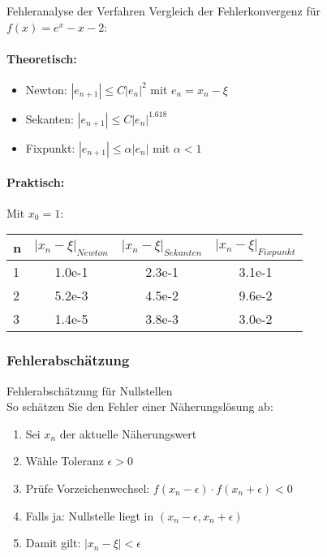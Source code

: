 \begin{example2}{Fehleranalyse der Verfahren}
Vergleich der Fehlerkonvergenz für $f(x) = e^x - x - 2$:

\paragraph{Theoretisch:}
\begin{itemize}
    \item Newton: $|e_{n+1}| \leq C|e_n|^2$ mit $e_n = x_n - \xi$
    \item Sekanten: $|e_{n+1}| \leq C|e_n|^{1.618}$
    \item Fixpunkt: $|e_{n+1}| \leq \alpha|e_n|$ mit $\alpha < 1$
\end{itemize}

\paragraph{Praktisch:} Mit $x_0 = 1$:
\begin{center}
\begin{tabular}{l|c|c|c}
n & $|x_n-\xi|_{Newton}$ & $|x_n-\xi|_{Sekanten}$ & $|x_n-\xi|_{Fixpunkt}$ \\\hline
1 & 1.0e-1 & 2.3e-1 & 3.1e-1 \\
2 & 5.2e-3 & 4.5e-2 & 9.6e-2 \\
3 & 1.4e-5 & 3.8e-3 & 3.0e-2
\end{tabular}
\end{center}
\end{example2}


\subsubsection{Fehlerabschätzung}



\begin{KR}{Fehlerabschätzung für Nullstellen}\\
So schätzen Sie den Fehler einer Näherungslösung ab:
\begin{enumerate}
    \item Sei $x_n$ der aktuelle Näherungswert
    \item Wähle Toleranz $\epsilon > 0$
    \item Prüfe Vorzeichenwechsel: $f(x_n-\epsilon) \cdot f(x_n+\epsilon) < 0$
    \item Falls ja: Nullstelle liegt in $(x_n-\epsilon, x_n+\epsilon)$
    \item Damit gilt: $|x_n-\xi| < \epsilon$
\end{enumerate}
\end{KR}


